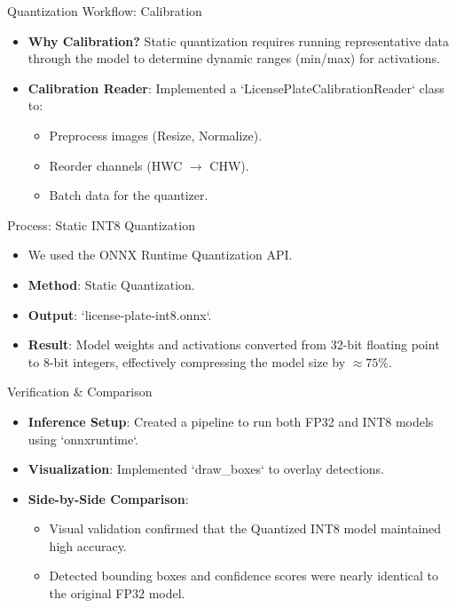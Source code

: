 \documentclass{beamer}
\begin{document}
\begin{frame}{Quantization Workflow: Calibration}
    \begin{itemize}
        \item \textbf{Why Calibration?} Static quantization requires running representative data through the model to determine dynamic ranges (min/max) for activations.
        \item \textbf{Calibration Reader}: Implemented a `LicensePlateCalibrationReader` class to:
        \begin{itemize}
            \item Preprocess images (Resize, Normalize).
            \item Reorder channels (HWC $\to$ CHW).
            \item Batch data for the quantizer.
        \end{itemize}
    \end{itemize}
\end{frame}

\begin{frame}{Process: Static INT8 Quantization}
    \begin{itemize}
        \item We used the ONNX Runtime Quantization API.
        \item \textbf{Method}: Static Quantization.
        \item \textbf{Output}: `license-plate-int8.onnx`.
        \item \textbf{Result}: Model weights and activations converted from 32-bit floating point to 8-bit integers, effectively compressing the model size by $\approx 75\%$.
    \end{itemize}
\end{frame}

\begin{frame}{Verification & Comparison}
    \begin{itemize}
        \item \textbf{Inference Setup}: Created a pipeline to run both FP32 and INT8 models using `onnxruntime`.
        \item \textbf{Visualization}: Implemented `draw\_boxes` to overlay detections.
        \item \textbf{Side-by-Side Comparison}:
        \begin{itemize}
            \item Visual validation confirmed that the Quantized INT8 model maintained high accuracy.
            \item Detected bounding boxes and confidence scores were nearly identical to the original FP32 model.
        \end{itemize}
    \end{itemize}
\end{frame}
\end{document}
